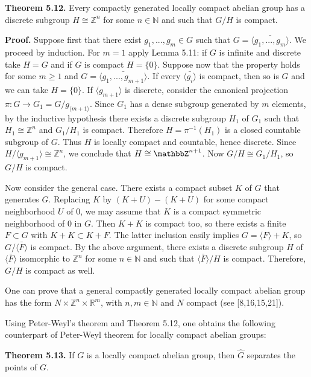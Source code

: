 \documentclass[12pt]{article}
\begin{document}
\textbf{Theorem 5.12.} Every compactly generated locally compact abelian group has a discrete subgroup $H \cong \mathbb{Z}^n$ for some $n \in \mathbb{N}$ and such
that $G/H$ is compact.


    \textbf{Proof.} Suppose first that there exist $g_1,..., g_m \in G$ such that $G = \bar{\langle g_1,..., g_m \rangle}$. We proceed by induction. For $m = 1$ apply
Lemma 5.11: if $G$ is infinite and discrete take $H = G$ and if $G$ is compact $H = \{0\}$. Suppose now that the property holds
for some $m \geqslant 1$ and $G = \bar{\langle g_1,..., g_{m+1} \rangle}$. If every $\bar{\langle g_i \rangle}$ is compact, then so is $G$ and we can take $H = \{0\}$. If $\langle g_{m+1} \rangle$ is discrete,
consider the canonical projection $\pi : G \to G_1 = G/g_{\langle m+1 \rangle}$. Since $G_1$ has a dense subgroup generated by $m$ elements,
by the inductive hypothesis there exists a discrete subgroup $H_1$ of $G_1$ such that $H_1 \cong \mathbb{Z}^n$ and $G_1/H_1$ is compact. Therefore
$H = \pi^{-1}(H_1)$ is a closed countable subgroup of $G$. Thus $H$ is locally compact and countable, hence discrete. Since
$H/\langle g_{m+1} \rangle \cong \mathbb{Z}^n$, we conclude that $H \cong \mathbbZ^{n+1}$. Now $G/H \cong G_1/H_1$, so $G/H$ is compact.


    Now consider the general case. There exists a compact subset $K$ of $G$ that generates $G$. Replacing $K$ by $(K + U) - (K + U)$
for some compact neighborhood $U$ of 0, we may assume that $K$ is a compact symmetric neighborhood of 0 in $G$. Then $K + K$
is compact too, so there exists a finite $F \subset G$ with $K + K \subset K + F$. The latter inclusion easily implies $G = \langle F \rangle + K$, so $G/\bar{\langle F \rangle}$ 
is compact. By the above argument, there exists a discrete subgroup $H$ of $\bar{\langle F \rangle}$ isomorphic to $\mathbb{Z}^n$ for some $n \in \mathbb{N}$ and such
that $\bar{\langle F \rangle}/H$ is compact. Therefore, $G/H$ is compact as well. 


    One can prove that a general compactly generated locally compact abelian group has the form $N \times \mathbb{Z}^n \times \mathbb{R}^m$, with $n,m \in \mathbb{N}$
and $N$ compact (see [8,16,15,21]).


    Using Peter-Weyl's theorem and Theorem 5.12, one obtains the following counterpart of Peter-Weyl theorem for locally
compact abelian groups:


\textbf{Theorem 5.13.} If $G$ is a locally compact abelian group, then $\hat{G}$ separates the points of $G$.
\end{document}
